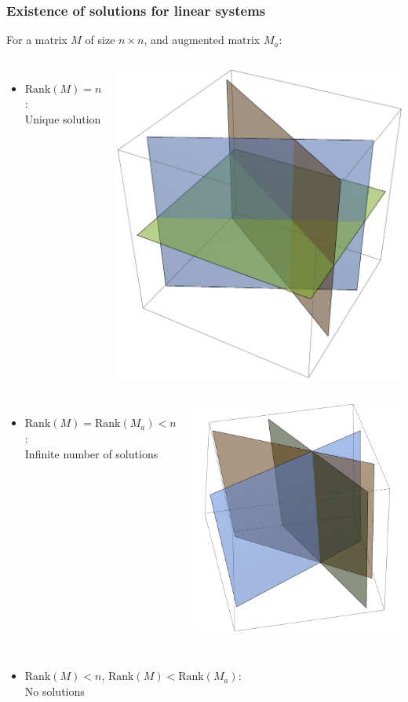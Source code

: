 \documentclass[11pt,table,final,xcolor={usenames,dvipsnames,table}]{beamer}
\begin{document}
\begin{frame}
 \frametitle{Existence of solutions for linear systems}
  For a matrix $M$ of size $n \times n$, and augmented matrix $M_a$:
 \begin{columns}
 \begin{itemize}
   \item $\text{Rank}(M) = n$:\\ Unique solution
 \end{itemize}
   \includegraphics[width=0.4\columnwidth]{img/Rank_1-solution}
 \end{columns}
 \pause
  \begin{columns}
 \begin{itemize}
   \item $\text{Rank}(M) = \text{Rank}(M_a) < n$:\\ Infinite number of solutions
 \end{itemize}
   \includegraphics[width=0.4\columnwidth]{img/Rank_Inf-solutions}
 \end{columns}
 \pause
  \begin{columns}
 \begin{itemize}
   \item $\text{Rank}(M) < n$, $\text{Rank}(M) < \text{Rank}(M_a)$:\\ No solutions

\end{itemize}
\end{columns}
\end{frame}
\end{document}
